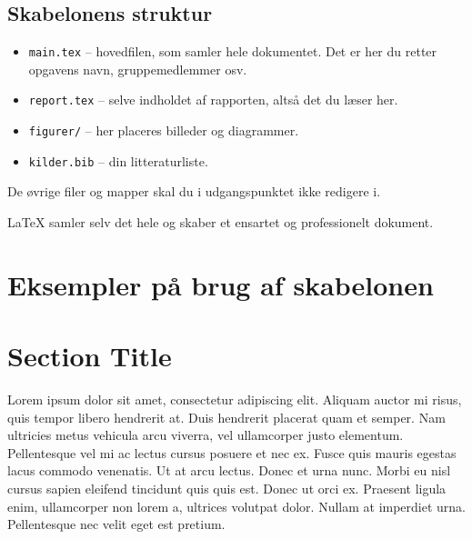 \subsection{Skabelonens struktur}
\begin{itemize}
  \item \texttt{main.tex} – hovedfilen, som samler hele dokumentet. Det er her du retter opgavens navn, gruppemedlemmer osv.
  \item \texttt{report.tex} – selve indholdet af rapporten, altså det du læser her.
  \item \texttt{figurer/} – her placeres billeder og diagrammer.
  \item \texttt{kilder.bib} – din litteraturliste.
\end{itemize}

De øvrige filer og mapper skal du i udgangspunktet ikke redigere i.

LaTeX samler selv det hele og skaber et ensartet og professionelt dokument.

\newpage

\section{Eksempler på brug af skabelonen}


\section{Section Title} %

Lorem ipsum dolor sit amet, consectetur adipiscing elit. Aliquam auctor mi risus, quis tempor libero hendrerit at. Duis hendrerit placerat quam et semper. Nam ultricies metus vehicula arcu viverra, vel ullamcorper justo elementum. Pellentesque vel mi ac lectus cursus posuere et nec ex. Fusce quis mauris egestas lacus commodo venenatis. Ut at arcu lectus. Donec et urna nunc. Morbi eu nisl cursus sapien eleifend tincidunt quis quis est. Donec ut orci ex. Praesent ligula enim, ullamcorper non lorem a, ultrices volutpat dolor. Nullam at imperdiet urna. Pellentesque nec velit eget est pretium.

